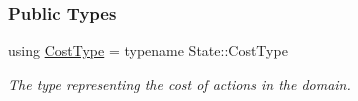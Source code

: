 \subsubsection*{Public Types}
\begin{DoxyCompactItemize}
\item 
using \hyperlink{structslb_1_1ext_1_1node_1_1BaseT_a25e9417da3d5610b8d379927697ed848}{Cost\+Type} = typename State\+::\+Cost\+Type\hypertarget{structslb_1_1ext_1_1node_1_1BaseT_a25e9417da3d5610b8d379927697ed848}{}\label{structslb_1_1ext_1_1node_1_1BaseT_a25e9417da3d5610b8d379927697ed848}

\begin{DoxyCompactList}\small\item\em The type representing the cost of actions in the domain. \end{DoxyCompactList}\end{DoxyCompactItemize}
